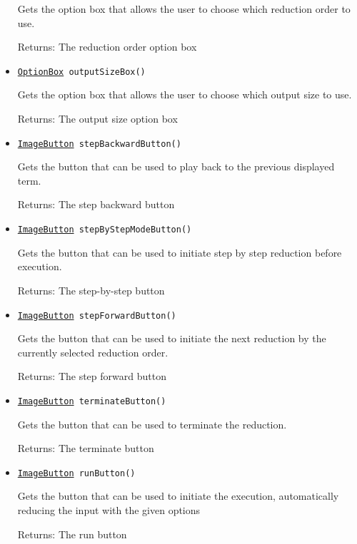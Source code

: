 \begin{itemize}
Gets the option box that allows the user to choose which reduction order to use.

Returns: The reduction order option box

\item \texttt{\hyperref[type:edu.kit.wavelength.client.view.webui.component.OptionBox]{OptionBox} outputSizeBox()}

Gets the option box that allows the user to choose which output size to use.

Returns: The output size option box

\item \texttt{\hyperref[type:edu.kit.wavelength.client.view.webui.component.ImageButton]{ImageButton} stepBackwardButton()}

Gets the button that can be used to play back to the previous displayed term.

Returns: The step backward button

\item \texttt{\hyperref[type:edu.kit.wavelength.client.view.webui.component.ImageButton]{ImageButton} stepByStepModeButton()}

Gets the button that can be used to initiate step by step reduction before execution.

Returns: The step-by-step button

\item \texttt{\hyperref[type:edu.kit.wavelength.client.view.webui.component.ImageButton]{ImageButton} stepForwardButton()}

Gets the button that can be used to initiate the next reduction by the currently selected reduction order.

Returns: The step forward button

\item \texttt{\hyperref[type:edu.kit.wavelength.client.view.webui.component.ImageButton]{ImageButton} terminateButton()}

Gets the button that can be used to terminate the reduction.

Returns: The terminate button

\item \texttt{\hyperref[type:edu.kit.wavelength.client.view.webui.component.ImageButton]{ImageButton} runButton()}

Gets the button that can be used to initiate the execution, automatically reducing the input with the given options

Returns: The run button


\end{itemize}
